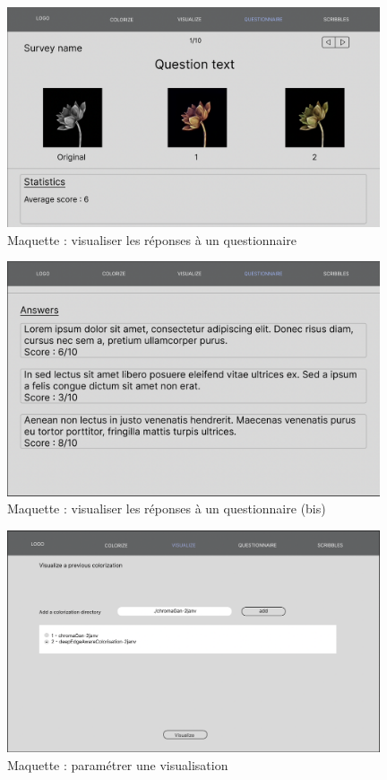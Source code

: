 \documentclass{article}
\begin{document}
\begin{figure}[htp]
    \centering
    \includegraphics[width=11cm]{questionnaire-visualiser-reponse.png}
    \caption{Maquette : visualiser les réponses à un questionnaire}
    \label{fig:maquette-questionnaire-visualiser-reponse}
\end{figure}

\begin{figure}[htp]
    \centering
    \includegraphics[width=11cm]{questionnaire-visualiser-reponse2.png}
    \caption{Maquette : visualiser les réponses à un questionnaire (bis)}
    \label{fig:maquette-questionnaire-visualiser-reponse2}
\end{figure}

\begin{figure}[htp]
    \centering
    \includegraphics[width=11cm]{visualiser-choix.png}
    \caption{Maquette : paramétrer une visualisation}
    \label{fig:maquette-visualiser-choix}
\end{figure}
\end{document}

